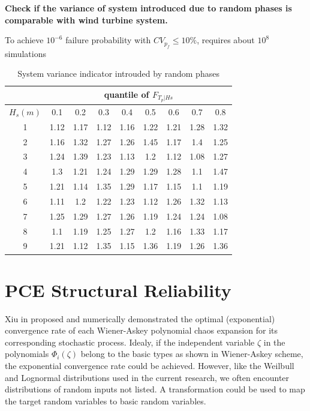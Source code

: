 \documentclass[twocolumn,10pt]{asme2e}
\begin{document}
\textbf{Check if the variance of system introduced due to random phases is comparable with wind turbine system.}

To achieve $10^{-6}$ failure probability with $CV_{p_f} \leq 10\%$, requires about $10^{8}$ simulations

\begin{table}[]
\centering
\caption{System variance indicator introuded by random phases}
\label{my-label}
\begin{tabular}{ccccccccc} \hline
  & \multicolumn{8}{c}{quantile of $F_{T_p | Hs}$}           \\ \hline
$H_s (m)$ & 0.1  & 0.2  & 0.3  & 0.4  & 0.5  & 0.6  & 0.7  & 0.8  \\ \hline
1     & 1.12 & 1.17 & 1.12 & 1.16 & 1.22 & 1.21 & 1.28 & 1.32 \\
2     & 1.16 & 1.32 & 1.27 & 1.26 & 1.45 & 1.17 & 1.4  & 1.25 \\
3     & 1.24 & 1.39 & 1.23 & 1.13 & 1.2  & 1.12 & 1.08 & 1.27 \\
4     & 1.3  & 1.21 & 1.24 & 1.29 & 1.29 & 1.28 & 1.1  & 1.47 \\
5     & 1.21 & 1.14 & 1.35 & 1.29 & 1.17 & 1.15 & 1.1  & 1.19 \\
6     & 1.11 & 1.2  & 1.22 & 1.23 & 1.12 & 1.26 & 1.32 & 1.13 \\
7     & 1.25 & 1.29 & 1.27 & 1.26 & 1.19 & 1.24 & 1.24 & 1.08 \\
8     & 1.1  & 1.19 & 1.25 & 1.27 & 1.2  & 1.16 & 1.33 & 1.17 \\
9     & 1.21 & 1.12 & 1.35 & 1.15 & 1.36 & 1.19 & 1.26 & 1.36 \\ \hline
\end{tabular}
\end{table}
\section{PCE Structural Reliability}

Xiu in \cite{xiu2002wiener} proposed and numerically demonstrated the optimal (exponential) convergence rate of each Wiener-Askey polynomial chaos expansion for its corresponding stochastic process. Idealy, if the independent variable $\zeta$ in the polynomials ${\Phi_i(\zeta)}$ belong to the basic types as shown in Wiener-Askey scheme, the exponential convergence rate could be achieved. However, like the Weilbull and Lognormal distributions used in the current research, we often encounter distributions of random inputs not listed. A transformation could be used to map the target random variables to basic random variables. 
\end{document}
